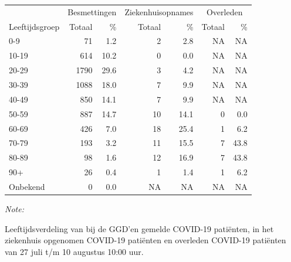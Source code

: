 \documentclass[
  english,
  man,floatsintext]{apa6}
\begin{document}
\begin{table}[H]
\centering\begingroup\fontsize{11}{13}\selectfont

\begin{threeparttable}
\begin{tabular}{lrrrrrr}
\toprule
\multicolumn{1}{c}{ } & \multicolumn{2}{c}{Besmettingen} & \multicolumn{2}{c}{Ziekenhuisopnames} & \multicolumn{2}{c}{Overleden} \\
\cmidrule(l{3pt}r{3pt}){2-3} \cmidrule(l{3pt}r{3pt}){4-5} \cmidrule(l{3pt}r{3pt}){6-7}
Leeftijdsgroep & Totaal & \% & Totaal & \% & Totaal & \%\\
\midrule
0-9 & 71 & 1.2 & 2 & 2.8 & NA & NA\\
10-19 & 614 & 10.2 & 0 & 0.0 & NA & NA\\
20-29 & 1790 & 29.6 & 3 & 4.2 & NA & NA\\
30-39 & 1088 & 18.0 & 7 & 9.9 & NA & NA\\
40-49 & 850 & 14.1 & 7 & 9.9 & NA & NA\\
50-59 & 887 & 14.7 & 10 & 14.1 & 0 & 0.0\\
60-69 & 426 & 7.0 & 18 & 25.4 & 1 & 6.2\\
70-79 & 193 & 3.2 & 11 & 15.5 & 7 & 43.8\\
80-89 & 98 & 1.6 & 12 & 16.9 & 7 & 43.8\\
90+ & 26 & 0.4 & 1 & 1.4 & 1 & 6.2\\
Onbekend & 0 & 0.0 & NA & NA & NA & NA\\
\bottomrule
\end{tabular}
\begin{tablenotes}
\item \textit{Note: } 
\item Leeftijdsverdeling van bij de GGD’en gemelde COVID-19 patiënten, in het ziekenhuis opgenomen COVID-19 patiënten en overleden COVID-19 patiënten van 27 juli t/m 10 augustus 10:00 uur.
\end{tablenotes}
\end{threeparttable}
\endgroup{}
\end{table}
\end{document}
